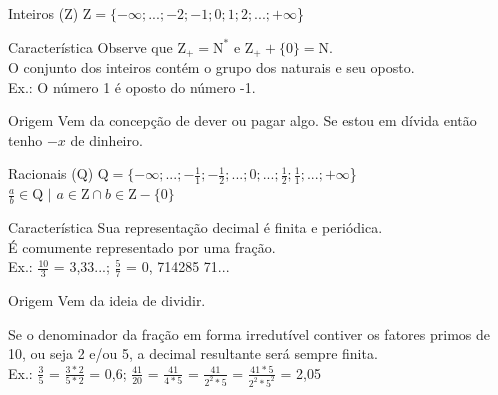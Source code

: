 \documentclass{beamer}
\begin{document}
    \begin{frame}{Inteiros ($\mathrm{Z}$)}
        $\mathrm{Z} = \{-\infty; ...; -2; -1; 0; 1; 2; ...; +\infty$\}
        \newline
        \begin{block}{Característica}
            Observe que $\mathrm{Z_+} = \mathrm{N^*}$ e $\mathrm{Z_+} +\{0\} = \mathrm{N}$.\\
            O conjunto dos inteiros contém o grupo dos naturais e seu oposto.\\
            Ex.: O número 1 é oposto do número -1.
        \end{block}
        \begin{block}{Origem}
            Vem da concepção de dever ou pagar algo. Se estou em dívida então tenho $-x$ de dinheiro.
        \end{block}
    \end{frame}
    
    \begin{frame}{Racionais ($\mathrm{Q}$)}
        $\mathrm{Q} = \{-\infty; ...; -\frac{1}{1}; -\frac{1}{2}; ...; 0; ...; \frac{1}{2}; \frac{1}{1}; ...; +\infty$\}\\
        $\frac{a}{b} \in \mathrm{Q}$ $|$ $a \in \mathrm{Z} \cap b \in \mathrm{Z - \{0\}}$
        \newline
        \begin{block}{Característica}
            Sua representação decimal é finita e periódica.\\ É comumente representado por uma fração.\\
            Ex.: $\frac{10}{3}$ = 3,33...; $\frac{5}{7}$ = 0, 714285 71...
        \end{block}
        \begin{block}{Origem}
            Vem da ideia de dividir.
        \end{block}
        \begin{alertblock}{}
            Se o denominador da fração em forma irredutível contiver os fatores primos de 10, ou seja 2 e/ou 5, a decimal resultante será sempre finita.\\
            Ex.: $\frac{3}{5}$ = $\frac{3*2}{5*2}$ = 0,6; $\frac{41}{20}$ = $\frac{41}{4*5}$ = $\frac{41}{2^2*5}$ = $\frac{41*5}{2^2*5^2}$ = 2,05
        \end{alertblock}
    \end{frame}
    
\end{document}

